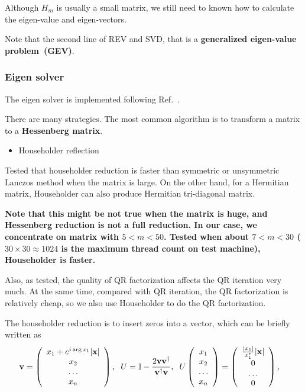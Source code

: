 Although $H_m$ is usually a small matrix, we still need to known how to calculate the eigen-value and eigen-vectors.

Note that the second line of REV and SVD, that is a \textbf{generalized eigen-value problem~(GEV)}.

\subsubsection{\label{sec:eigenSolver}Eigen solver}

The eigen solver is implemented following Ref.~\cite{matrixcomputation}.

There are many strategies. The most common algorithm is to transform a matrix to a \textbf{Hessenberg matrix}.

\begin{itemize}
  \item {}Householder reflection
\end{itemize}

Tested that householder reduction is faster than symmetric or unsymmetric Lanczos method when the matrix is large. On the other hand, for a Hermitian matrix, Householder can also produce Hermitian tri-diagonal matrix.

\textbf{Note that this might be not true when the matrix is huge, and Hessenberg reduction is not a full reduction. In our case, we concentrate on matrix with $5<m<50$. Tested when about $7<m<30$ ($30 \times 30 \approx 1024$ is the maximum thread count on test machine), Householder is faster.}

Also, as tested, the quality of QR factorization affects the QR iteration very much. At the same time, compared with QR iteration, the QR factorization is relatively cheap, so we also use Householder to do the QR factorization.

The householder reduction is to insert zeros into a vector, which can be briefly written as
\begin{equation}
\begin{split}
&{\bf v}=\left(\begin{array}{c} x_1+e^{i \arg{x_1}}|{\bf x}|\\x_2\\ \ldots \\ x_n\end{array}\right),\;\;U=\mathbb{I}-\frac{2{\bf v}{\bf v}^{\dagger}}{{\bf v}^{\dagger}{\bf v}},\;\;U\left(\begin{array}{c} x_1\\x_2\\ \ldots \\ x_n\end{array}\right)=\left(\begin{array}{c} \frac{|x_1|}{x_1^*}|{\bf x}|\\0\\ \ldots \\ 0\end{array}\right),
\end{split}
\end{equation}

